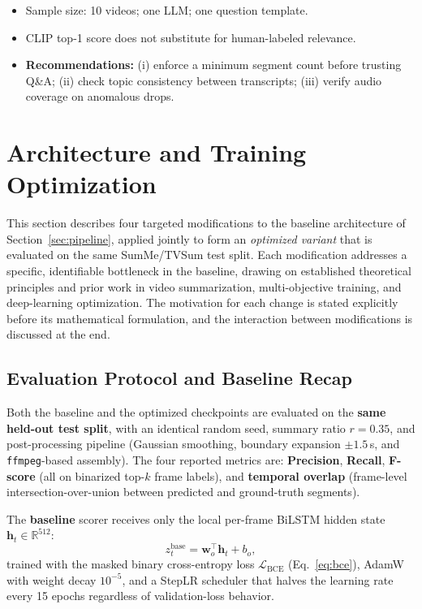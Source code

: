 \documentclass[10pt,conference]{IEEEtran}
\begin{document}
\begin{itemize}
  \item Sample size: 10 videos; one LLM; one question template.
  \item CLIP top-1 score does not substitute for human-labeled relevance.
  \item \textbf{Recommendations:} (i) enforce a minimum segment count before
        trusting Q\&A; (ii) check topic consistency between transcripts;
        (iii) verify audio coverage on anomalous drops.
\end{itemize}

\section{Architecture and Training Optimization}
\label{sec:optimize}

This section describes four targeted modifications to the baseline
architecture of Section~\ref{sec:pipeline}, applied jointly to form an
\emph{optimized variant} that is evaluated on the same SumMe/TVSum test
split. Each modification addresses a specific, identifiable bottleneck in the
baseline, drawing on established theoretical principles and prior work in video
summarization, multi-objective training, and deep-learning optimization. The
motivation for each change is stated explicitly before its mathematical
formulation, and the interaction between modifications is discussed at the end.

\subsection{Evaluation Protocol and Baseline Recap}

Both the baseline and the optimized checkpoints are evaluated on the
\textbf{same held-out test split}, with an identical random seed, summary
ratio $r{=}0.35$, and post-processing pipeline (Gaussian smoothing, boundary
expansion $\pm 1.5$\,s, and \texttt{ffmpeg}-based assembly). The four reported
metrics are: \textbf{Precision}, \textbf{Recall}, \textbf{F-score} (all on
binarized top-$k$ frame labels), and \textbf{temporal overlap} (frame-level
intersection-over-union between predicted and ground-truth segments).

The \textbf{baseline} scorer receives only the local per-frame BiLSTM hidden
state $\mathbf{h}_t \in \mathbb{R}^{512}$:
\begin{equation}
  z_t^{\text{base}} = \mathbf{w}_o^\top \mathbf{h}_t + b_o,
  \label{eq:base_scorer}
\end{equation}
trained with the masked binary cross-entropy loss $\mathcal{L}_\text{BCE}$
(Eq.~\ref{eq:bce}), AdamW with weight decay $10^{-5}$, and a StepLR
scheduler that halves the learning rate every 15 epochs regardless of
validation-loss behavior.
\end{document}
